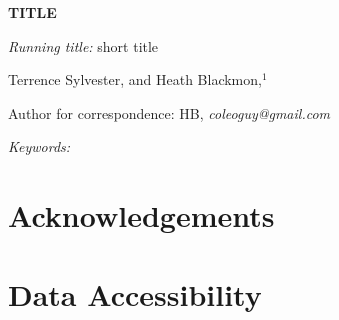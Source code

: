 \documentclass[12pt]{article}
\begin{document}
\linenumbers

\begin{center}
\textbf{TITLE}
\end{center}

\vfill
\noindent
\textit{Running title:} short title


\vfill
\noindent
Terrence Sylvester,
%
\noindent
and
Heath Blackmon,$^1$
\vfill


\theendnotes
\noindent
Author for correspondence: HB, \textit{coleoguy@gmail.com}
\vfill

\clearpage

 
\bigskip
\noindent
\textit{Keywords: }


\clearpage





\section{Acknowledgements}




\section{Data Accessibility}





\clearpage




\nolinenumbers
\clearpage

% 
\clearpage

\end{document}

